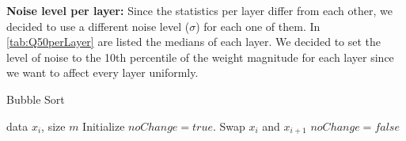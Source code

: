 \textbf{Noise level per layer:}
Since the statistics per layer differ from each other, we decided to use a different noise level ($\sigma$) for each one of them. In \cref{tab:Q50perLayer} are listed the medians of each layer. We decided to set the level of noise to the 10th percentile of the weight magnitude for each layer since we want to affect every layer uniformly.











\begin{algorithm}[tb]
   \caption{Bubble Sort}
   \label{alg:example}
\begin{algorithmic}
    data $x_i$, size $m$
   \REPEAT
   \STATE Initialize $noChange = true$.
   \STATE Swap $x_i$ and $x_{i+1}$
   \STATE $noChange = false$
   \ENDIF
   \ENDFOR
\end{algorithmic}
\end{algorithm}
 















